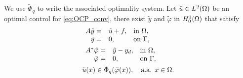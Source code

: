 We use $\tilde \Phi_q$ to write the associated optimality system. Let $\tilde u \in L^2(\Omega)$ be an optimal control for \eqref{eq:OCP_conv}, there exist $\tilde y$ and $\tilde \varphi$ in $H_0^1(\Omega)$ that satisfy
\begin{subequations}\label{eq:system2.5_convex}
		\begin{align} 
			&	\begin{array}{rll}
				A   \tilde y  =& \tilde u + f, &\hbox{in  } \Omega, \\
				\tilde y=&0, &\hbox{on  }  \Gamma,
			\end{array} \\
			&\begin{array}{rll}
				A^*   \tilde\varphi=& \tilde y -y_d, &\hbox{in  } \Omega, \\
				\tilde \varphi=&0, &\hbox{on  }  \Gamma,
			\end{array}\label{eq:statey_2_convex}\\
			&\tilde u (x) \in \tilde\Phi_q (\tilde\varphi(x)), \quad  \text{a.a. } x \in \Omega. \label{eq:uPhi.1_convex}
		\end{align} 	
	\end{subequations}
